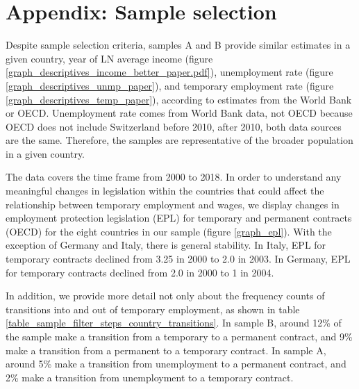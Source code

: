 \clearpage
\section{Appendix: Sample selection}\label{sec:sample_selection}
\setcounter{figure}{0}    
\setcounter{table}{0}    
\renewcommand*\thetable{\Alph{section}.\arabic{table}}
\renewcommand*\thefigure{\Alph{section}.\arabic{figure}}
\renewcommand{\theHfigure}{\Alph{section}.\arabic{table}}
\renewcommand{\theHtable}{\Alph{section}.\arabic{figure}}

Despite sample selection criteria, samples A and B provide similar estimates in a given country, year of LN average income (figure \ref{graph_descriptives_income_better_paper.pdf}), unemployment rate (figure \ref{graph_descriptives_unmp_paper}), and temporary employment rate (figure  \ref{graph_descriptives_temp_paper}), according to estimates from the World Bank or OECD.  Unemployment rate comes from World Bank data, not OECD because OECD does not include Switzerland before 2010, after 2010, both data sources are the same.  Therefore, the samples are representative of the broader population in a given country.  

The data covers the time frame from 2000 to 2018.  In order to understand any meaningful changes in legislation within the countries that could affect the relationship between temporary employment and wages, we display changes in employment protection legislation (EPL) for temporary and permanent contracts (OECD) for the eight countries in our sample (figure \ref{graph_epl}).  With the exception of Germany and Italy, there is general stability.  In Italy, EPL for temporary contracts declined from 3.25 in 2000 to 2.0 in 2003.  In Germany, EPL for temporary contracts declined from 2.0 in 2000 to 1 in 2004.  

In addition, we provide more detail not only about the frequency counts of transitions into and out of temporary employment, as shown in table \ref{table_sample_filter_steps_country_transitions}.  In sample B, around 12\% of the sample make a transition from a temporary to a permanent contract, and 9\% make a transition from a permanent to a temporary contract.  In sample A, around 5\% make a transition from unemployment to a permanent contract, and 2\% make a transition from unemployment to a temporary contract. 

